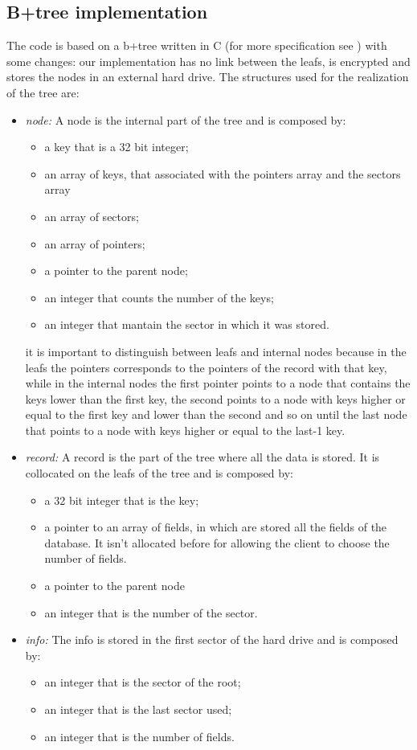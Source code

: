 \subsection{B+tree implementation}
The code is based on a b+tree written in C (for more specification see \cite{bplustree}) with some changes: our implementation has no link between the leafs, is encrypted and stores the nodes in an external hard drive.
The structures used for the realization of the tree are:
\begin{itemize}
    \item \emph{node:} A node is the internal part of the tree and is composed by:
    \begin{itemize}
        \item a key that is a 32 bit integer;
        \item an array of keys, that associated with the pointers array and the sectors array 
        \item an array of sectors;
        \item an array of pointers;
        \item a pointer to the parent node;
        \item an integer that counts the number of the keys;
        \item an integer that mantain the sector in which it was stored.
    \end{itemize}
    it is important to distinguish between leafs and internal nodes because in the leafs the pointers corresponds to the pointers of the record with that key, while in the internal nodes the first pointer points to a node that contains the keys lower than the first key, the second points to a node with keys higher or equal to the first key and lower than the second and so on until the last node that points to a node with keys higher or equal to the last-1 key.
    \item \emph{record:} A record is the part of the tree where all the data is stored. It is collocated on the leafs of the tree and is composed by:
    \begin{itemize}
        \item a 32 bit integer that is the key;
        \item a pointer to an array of fields, in which are stored all the fields of the database. It isn't allocated before for allowing the client to choose the number of fields.
        \item a pointer to the parent node
        \item an integer that is the number of the sector.
    \end{itemize}
    \item \emph{info:} The info is stored in the first sector of the hard drive and is composed by:
    \begin{itemize}
        \item an integer that is the sector of the root;
        \item an integer that is the last sector used;
        \item an integer that is the number of fields.
    \end{itemize}
\end{itemize}
